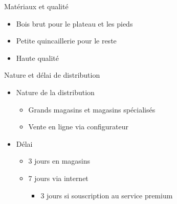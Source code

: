 \begin{frame}{Matériaux et qualité}
\begin{itemize}
\item Bois brut pour le plateau et les pieds
\item Petite quincaillerie pour le reste
\item Haute qualité
\end{itemize}
\end{frame}

\begin{frame}{Nature et délai de distribution}
\begin{itemize}
\item Nature de la distribution
\begin{itemize}
\item Grands magasins et magasins spécialisés
\item Vente en ligne via configurateur
\end{itemize}
\item Délai 
\begin{itemize}
\item 3 jours en magasins
\item 7 jours via internet
\begin{itemize}
\item 3 jours si souscription au service premium
\end{itemize}
\end{itemize}
\end{itemize}
\end{frame}